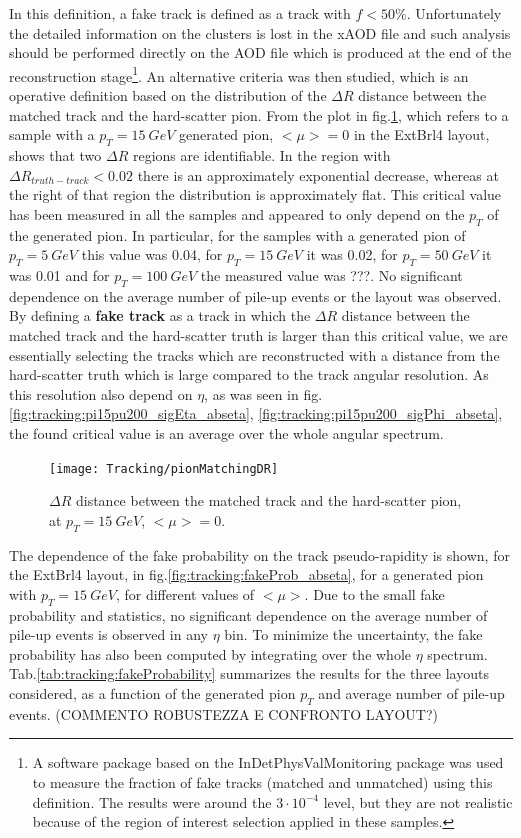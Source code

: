 \documentclass[a4paper,twoside,12pt]{article}
\begin{document}
In this definition, a fake track is defined as a track with $f < 50\%$. Unfortunately the detailed information on the clusters is lost in the xAOD file and such analysis should be performed directly on the AOD file
which is produced at the end of the reconstruction stage\footnote{A software package based on the InDetPhysValMonitoring package was used to measure the fraction of fake tracks (matched and unmatched) using this definition. The results were around the $3\cdot 10^{-4}$ level, but they are not realistic because of the region of interest selection applied in these samples.}. An alternative criteria was then studied, which is an operative definition based on the distribution of the $\Delta R$ distance between the matched track and
the hard-scatter pion. From the plot in fig.\ref{fig:tracking:pionMatchingDR}, which refers to a sample with a $p_{T} = 15\ GeV$ generated pion, $<\mu> = 0$ in the ExtBrl4 layout, shows 
that two $\Delta R$ regions are identifiable. In the region with $\Delta R_{truth-track} < 0.02$ there is an approximately exponential decrease, whereas at the right of that region the distribution is approximately flat. This critical value has been measured in all the samples and appeared to only depend on the $p_{T}$ of the generated pion. In particular, for the samples with a generated pion of $p_{T} = 5\ GeV$ this value was 0.04, for $p_{T} = 15\ GeV$ it was 0.02, for $p_{T} = 50\ GeV$ it was 0.01 and for $p_{T} = 100\ GeV$ the measured value was ???. No significant dependence on the average number of pile-up events or the layout was observed. By defining
a \textbf{fake track} as a track in which the $\Delta R$ distance between the matched track and the hard-scatter truth is larger than this critical value, we are essentially selecting the tracks
which are reconstructed with a distance from the hard-scatter truth which is large compared to the track angular resolution. As this resolution also depend on $\eta$, as was seen in fig.
\ref{fig:tracking:pi15pu200_sigEta_abseta}, \ref{fig:tracking:pi15pu200_sigPhi_abseta}, the found critical value is an average over the whole angular spectrum.\\

\begin{figure}
\centering
\texttt{[image: Tracking/pionMatchingDR]}
\caption{$\Delta R$ distance between the matched track and the hard-scatter pion, at $p_{T} = 15\ GeV$, $<\mu> = 0$.} 
\label{fig:tracking:pionMatchingDR}
\end{figure}


The dependence of the fake probability on the track pseudo-rapidity is shown, for the ExtBrl4 layout, in fig.\ref{fig:tracking:fakeProb_abseta}, for a generated pion with $p_{T} = 15\ GeV$, for 
different values of $<\mu>$. Due to the small fake probability and statistics, no significant dependence on the average number of pile-up events is observed in any $\eta$ bin. To minimize
the uncertainty, the fake probability has also been computed by integrating over the whole $\eta$ spectrum. Tab.\ref{tab:tracking:fakeProbability} summarizes the results for the three layouts considered, as a function of the generated pion $p_{T}$ and average number of pile-up events. (COMMENTO ROBUSTEZZA E CONFRONTO LAYOUT?)\\ 
\end{document}
